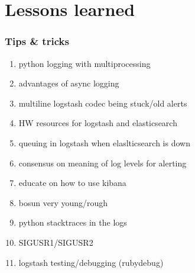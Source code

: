 \documentclass[13pt, ignorenonframetext]{beamer}
\begin{document}
\section{Lessons learned}
\begin{frame}
\frametitle{Tips \& tricks}
\begin{enumerate}
\item python logging with multiprocessing
\item advantages of async logging
\item multiline logstash codec being stuck/old alerts
\item HW resources for logstash and elasticsearch
\item queuing in logstash when elaslticsearch is down
\item consensus on meaning of log levels for alerting
\item educate on how to use kibana
\item bosun very young/rough
\item python stacktraces in the logs
\item SIGUSR1/SIGUSR2
\item logstash testing/debugging (rubydebug)
\end{enumerate}
\end{frame}


\end{document}
